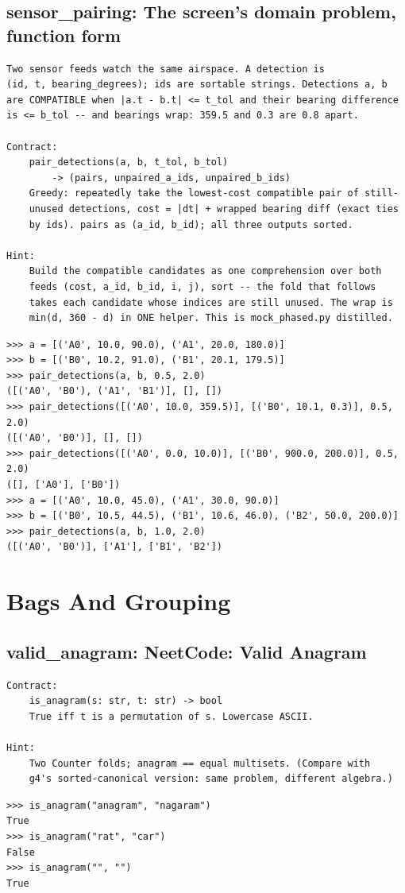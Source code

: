 \documentclass[10pt,letterpaper]{book}
\begin{document}
\section{sensor\_pairing: The screen's domain problem, function form}
\begin{lstlisting}[style=ex]
Two sensor feeds watch the same airspace. A detection is
(id, t, bearing_degrees); ids are sortable strings. Detections a, b
are COMPATIBLE when |a.t - b.t| <= t_tol and their bearing difference
is <= b_tol -- and bearings wrap: 359.5 and 0.3 are 0.8 apart.

Contract:
    pair_detections(a, b, t_tol, b_tol)
        -> (pairs, unpaired_a_ids, unpaired_b_ids)
    Greedy: repeatedly take the lowest-cost compatible pair of still-
    unused detections, cost = |dt| + wrapped bearing diff (exact ties
    by ids). pairs as (a_id, b_id); all three outputs sorted.

Hint:
    Build the compatible candidates as one comprehension over both
    feeds (cost, a_id, b_id, i, j), sort -- the fold that follows
    takes each candidate whose indices are still unused. The wrap is
    min(d, 360 - d) in ONE helper. This is mock_phased.py distilled.
\end{lstlisting}
\begin{lstlisting}[style=ex]
>>> a = [('A0', 10.0, 90.0), ('A1', 20.0, 180.0)]
>>> b = [('B0', 10.2, 91.0), ('B1', 20.1, 179.5)]
>>> pair_detections(a, b, 0.5, 2.0)
([('A0', 'B0'), ('A1', 'B1')], [], [])
>>> pair_detections([('A0', 10.0, 359.5)], [('B0', 10.1, 0.3)], 0.5, 2.0)
([('A0', 'B0')], [], [])
>>> pair_detections([('A0', 0.0, 10.0)], [('B0', 900.0, 200.0)], 0.5, 2.0)
([], ['A0'], ['B0'])
>>> a = [('A0', 10.0, 45.0), ('A1', 30.0, 90.0)]
>>> b = [('B0', 10.5, 44.5), ('B1', 10.6, 46.0), ('B2', 50.0, 200.0)]
>>> pair_detections(a, b, 1.0, 2.0)
([('A0', 'B0')], ['A1'], ['B1', 'B2'])
\end{lstlisting}
\chapter{Bags And Grouping}

\section{valid\_anagram: NeetCode: Valid Anagram}
\begin{lstlisting}[style=ex]
Contract:
    is_anagram(s: str, t: str) -> bool
    True iff t is a permutation of s. Lowercase ASCII.

Hint:
    Two Counter folds; anagram == equal multisets. (Compare with
    g4's sorted-canonical version: same problem, different algebra.)
\end{lstlisting}
\begin{lstlisting}[style=ex]
>>> is_anagram("anagram", "nagaram")
True
>>> is_anagram("rat", "car")
False
>>> is_anagram("", "")
True
\end{lstlisting}
\end{document}
